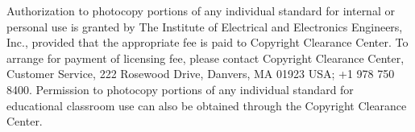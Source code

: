 Authorization to photocopy portions of any individual standard for internal or personal use is granted by The Institute of Electrical and Electronics Engineers, Inc., provided that the appropriate fee is paid to Copyright Clearance Center. To arrange for payment of licensing fee, please contact Copyright Clearance Center, Customer Service, 222 Rosewood Drive, Danvers, MA 01923 USA; +1 978 750 8400. Permission to photocopy portions of any individual standard for educational classroom use can also be obtained through the Copyright Clearance Center.
\endgroup
\clearpage
